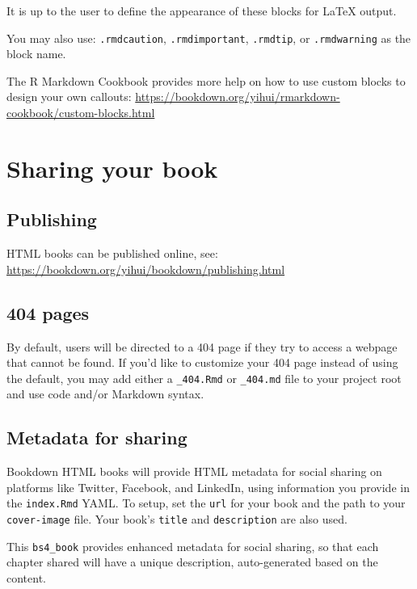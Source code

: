 \documentclass[
  xelatex, ja=standard]{bxjsbook}
\theoremstyle{definition}
\theoremstyle{definition}
\theoremstyle{definition}
\theoremstyle{definition}
\theoremstyle{remark}
\begin{document}
It is up to the user to define the appearance of these blocks for LaTeX output.

You may also use: \texttt{.rmdcaution}, \texttt{.rmdimportant}, \texttt{.rmdtip}, or \texttt{.rmdwarning} as the block name.

The R Markdown Cookbook provides more help on how to use custom blocks to design your own callouts: \url{https://bookdown.org/yihui/rmarkdown-cookbook/custom-blocks.html}

\hypertarget{sharing-your-book}{%
\section{Sharing your book}\label{sharing-your-book}}

\hypertarget{publishing}{%
\subsection{Publishing}\label{publishing}}

HTML books can be published online, see: \url{https://bookdown.org/yihui/bookdown/publishing.html}

\hypertarget{pages}{%
\subsection{404 pages}\label{pages}}

By default, users will be directed to a 404 page if they try to access a webpage that cannot be found. If you'd like to customize your 404 page instead of using the default, you may add either a \texttt{\_404.Rmd} or \texttt{\_404.md} file to your project root and use code and/or Markdown syntax.

\hypertarget{metadata-for-sharing}{%
\subsection{Metadata for sharing}\label{metadata-for-sharing}}

Bookdown HTML books will provide HTML metadata for social sharing on platforms like Twitter, Facebook, and LinkedIn, using information you provide in the \texttt{index.Rmd} YAML. To setup, set the \texttt{url} for your book and the path to your \texttt{cover-image} file. Your book's \texttt{title} and \texttt{description} are also used.

This \texttt{bs4\_book} provides enhanced metadata for social sharing, so that each chapter shared will have a unique description, auto-generated based on the content.
\end{document}
